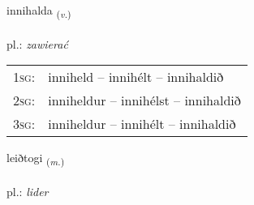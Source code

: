 \documentclass[frontgrid, backgrid]{flacards}\usepackage[]{graphicx}\usepackage[]{xcolor}
\begin{document}
\renewcommand{\flhead}{\vskip5pt \fboxsep=0pt {\small\bfseries\footnotesize Sagnorð | Verb}}
\renewcommand{\fcfoot}{\vskip5pt \fboxsep=0pt \hspace{2pt}{\small\bfseries\footnotesize 2K}}

\renewcommand{\blhead}{\vskip5pt {\small\bfseries\footnotesize Sagnorð | Verb }}
\renewcommand{\bcfoot}{\vskip5pt \hspace{2pt}{\small\bfseries\footnotesize 2K}}


{innihalda \small{\textsubscript{(\textit{v.})}} \\[1ex] %
\textphonetic{[ɪnɪhalta]} \\
pl.: \emph{zawierać} \\  [2ex]
\renewcommand*{\arraystretch}{0.8}
\begin{tabular}{p{1cm}l}
\textsc{1sg}: & inniheld -- innihélt -- innihaldið \\ 
\textsc{2sg}: & inniheldur -- innihélst -- innihaldið \\ 
\textsc{3sg}: & inniheldur -- innihélt -- innihaldið \\ 
\end{tabular}
}

\renewcommand{\flhead}{\vskip5pt \fboxsep=0pt {\small\bfseries\footnotesize Nafnorð | Noun}}
\renewcommand{\fcfoot}{\vskip5pt \fboxsep=0pt \hspace{2pt}{\small\bfseries\footnotesize 2K}}

\renewcommand{\blhead}{\vskip5pt {\small\bfseries\footnotesize Nafnorð | Noun }}
\renewcommand{\bcfoot}{\vskip5pt \hspace{2pt}{\small\bfseries\footnotesize 2K}}


{leiðtogi \small{\textsubscript{(\textit{m.})}} \\[1ex] %
\textphonetic{[leiðtʰɔijɪ]} \\
pl.: \emph{lider} \\  [2ex]
\renewcommand*{\arraystretch}{0.8}
}
\end{document}
